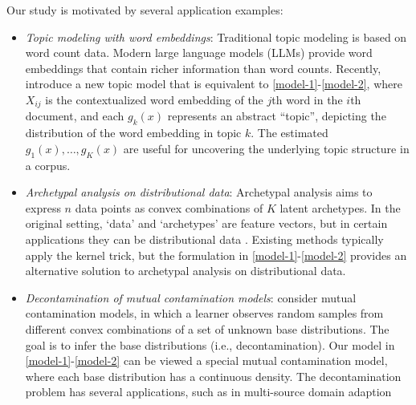 \documentclass[preprint,11pt]{article}
\numberwithin{equation}{section}
\begin{document}
Our study is motivated by several application examples: 
\begin{itemize}
\item {\it Topic modeling with word embeddings}: Traditional topic modeling is based on word count data. Modern large language models (LLMs) provide word embeddings that contain richer information than word counts.  Recently,  
\cite{austern2025poisson} introduce a new topic model that is equivalent to \eqref{model-1}-\eqref{model-2}, where $X_{ij}$ is the contextualized word embedding of the $j$th word in the $i$th document, and each $g_k(x)$ represents an abstract ``topic'', depicting the distribution of the word embedding in topic $k$. The estimated $g_1(x),\ldots, g_K(x)$ are useful for uncovering the underlying topic structure in a corpus. 
\item {\it Archetypal analysis on distributional data}: Archetypal analysis \citep{cutler1994archetypal} aims to express $n$ data points as convex combinations of $K$ latent archetypes. In the original setting, `data' and `archetypes' are feature vectors, but in certain applications they can be distributional data \citep{bauckhage2014kernel,wu2017prototypal}. 
Existing methods typically apply the kernel trick, but the formulation in \eqref{model-1}-\eqref{model-2} provides an alternative solution to archetypal analysis on distributional data. 
\item {\it Decontamination of mutual contamination models}: \cite{katz2019decontamination} consider mutual contamination models, in which a learner observes random samples from different convex combinations of a set of unknown base distributions. The goal is to infer the base distributions (i.e., decontamination). Our model 
in \eqref{model-1}-\eqref{model-2} 
can be viewed a special mutual contamination model, where each base distribution has a continuous density. 
The decontamination problem has several applications, such as in multi-source domain adaption \citep{zhan2024domain}
\end{itemize}
\end{document}
